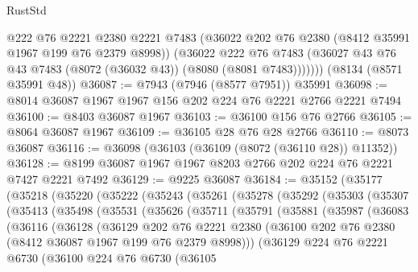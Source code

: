 \begin{lexlean}{RustStd}
\begin{coremodule}
{\begin{coremodule}
{{{{{{{{{{{{{{{{{{{{{{{{{{{{{{{{{{{{{{{{{{{{{{{{{{{{{          @222
          @76
          @2221
          @2380
          @2221
          @7483
          (@36022 @202 @76 @2380 (@8412 @35991 @1967 @199 @76 @2379 @8998))
          (@36022
            @222
            @76
            @7483
            (@36027 @43 @76 @43 @7483 (@8072 (@36032 @43)) (@8080 (@8081 @7483)))))))
    (@8134 (@8571 @35991 @48))
@36087 := @7943 (@7946 (@8577 @7951)) @35991
@36098 := @8014 @36087 @1967 @1967 @156 @202 @224 @76 @2221 @2766 @2221 @7494
@36100 := @8403 @36087 @1967
@36103 := @36100 @156 @76 @2766
@36105 := @8064 @36087 @1967
@36109 := @36105 @28 @76 @28 @2766
@36110 := @8073 @36087
@36116 := @36098 (@36103 (@36109 (@8072 (@36110 @28)) @11352))
@36128 := @8199 @36087 @1967 @1967 @8203 @2766 @202 @224 @76 @2221 @7427 @2221 @7492
@36129 := @9225 @36087
@36184 := @35152
    (@35177
      (@35218
        (@35220
          (@35222
            (@35243
              (@35261
                (@35278
                  (@35292
                    (@35303
                      (@35307
                        (@35413
                          (@35498
                            (@35531
                              (@35626
                                (@35711
                                  (@35791
                                    (@35881
                                      (@35987
                                        (@36083
                                          (@36116
                                            (@36128
                                              (@36129
                                                @202
                                                @76
                                                @2221
                                                @2380
                                                (@36100
                                                  @202
                                                  @76
                                                  @2380
                                                  (@8412 @36087 @1967 @199 @76 @2379 @8998)))
                                              (@36129
                                                @224
                                                @76
                                                @2221
                                                @6730
                                                (@36100
                                                  @224
                                                  @76
                                                  @6730
                                                  (@36105
}}}}}}}}}}}}}}}}}}}}}}}}}}}}}}}}}}}}}}}}}}}}}}}}}}}}}
\end{coremodule}}
\end{coremodule}
\end{lexlean}
